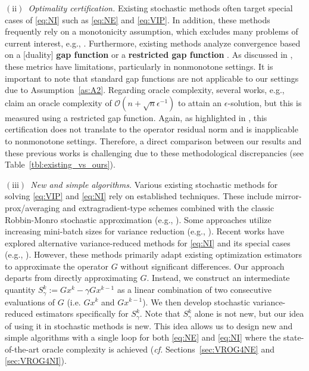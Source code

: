 \documentclass{article}
\theoremstyle{plain}
\theoremstyle{definition}
\theoremstyle{remark}
\begin{document}
\vspace{-0.5ex}
\textit{$\mathrm{(ii)}$~Optimality certification.} 
Existing stochastic methods often target special cases of \eqref{eq:NI} such as \eqref{eq:NE} and \eqref{eq:VIP}.
In addition, these methods frequently rely on a monotonicity assumption, which excludes many problems of current interest, e.g., \cite{alacaoglu2022beyond,alacaoglu2021stochastic,beznosikov2023stochastic,gorbunov2022stochastic,loizou2021stochastic}.
Furthermore, existing methods analyze convergence based on a [duality] \textbf{gap function} \citep{Facchinei2003} or a \textbf{restricted gap function} \citep{Nesterov2007a}.
As discussed in \cite{cai2023variance,diakonikolas2020halpern}, these metrics have limitations, particularly in nonmonotone settings. 
It is important to note that standard gap functions are not applicable to our settings due to Assumption~\ref{as:A2}.
Regarding oracle complexity, several works, e.g., \cite{alacaoglu2021stochastic,beznosikov2023stochastic,gorbunov2022stochastic,loizou2021stochastic} claim an oracle complexity of $\mathcal{O}(n + \sqrt{n}\epsilon^{-1})$  to attain an $\epsilon$-solution, but this is measured using a restricted gap function. 
Again, as highlighted in \cite{cai2023variance,diakonikolas2020halpern}, this certification does not translate to the operator residual norm and is inapplicable to nonmonotone settings.
Therefore, a direct comparison between our results and these previous works is challenging due to these methodological discrepancies (see Table~\ref{tbl:existing_vs_ours}).

\textit{$\mathrm{(iii)}$~New and simple algorithms.} 
Various existing stochastic methods for solving \eqref{eq:VIP} and \eqref{eq:NI} rely on established techniques. 
These include mirror-prox/averaging and extragradient-type schemes combined with the classic Robbin-Monro stochastic approximation \citep{RM1951} (e.g., \cite{cui2021analysis,iusem2017extragradient,juditsky2011solving,kannan2019optimal,kotsalis2022simple,yousefian2018stochastic}). 
Some approaches utilize increasing mini-batch sizes for variance reduction (e.g., \cite{iusem2017extragradient,pethick2023solving}).
Recent works have explored alternative variance-reduced methods for \eqref{eq:NI} and its special cases (e.g., \cite{alacaoglu2022beyond,alacaoglu2021stochastic,bot2019forward,cai2022stochastic,davis2022variance}). 
However, these methods primarily adapt existing optimization estimators to approximate the operator $G$ without significant differences.
Our approach departs from directly approximating $G$.  
Instead, we construct an intermediate quantity $S_{\gamma}^k := Gx^k - \gamma Gx^{k-1}$ as a linear combination of two consecutive evaluations of $G$ (i.e. $Gx^k$ and $Gx^{k-1}$). 
We then develop stochastic variance-reduced estimators specifically for $S_{\gamma}^k$.
Note that $S^k_{\gamma}$ alone is not new, but our idea of using it in stochastic methods is new.
This idea allows us to design new and simple algorithms with a single loop for both \eqref{eq:NE} and \eqref{eq:NI}  where the state-of-the-art oracle complexity is achieved (\textit{cf.} Sections~\ref{sec:VROG4NE} and \ref{sec:VROG4NI}).
\end{document}
